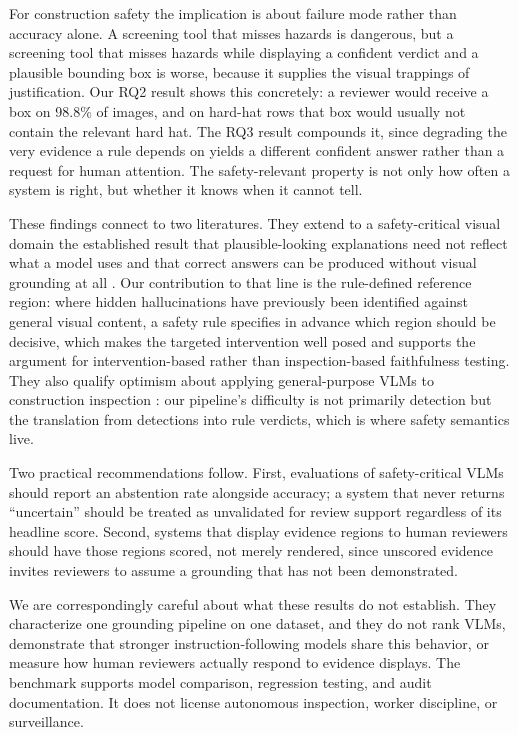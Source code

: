 \documentclass[conference]{IEEEtran}
\begin{document}
For construction safety the implication is about failure mode rather than accuracy alone. A screening tool that misses hazards is dangerous, but a screening tool that misses hazards while displaying a confident verdict and a plausible bounding box is worse, because it supplies the visual trappings of justification. Our RQ2 result shows this concretely: a reviewer would receive a box on 98.8\% of images, and on hard-hat rows that box would usually not contain the relevant hard hat. The RQ3 result compounds it, since degrading the very evidence a rule depends on yields a different confident answer rather than a request for human attention. The safety-relevant property is not only how often a system is right, but whether it knows when it cannot tell.

These findings connect to two literatures. They extend to a safety-critical visual domain the established result that plausible-looking explanations need not reflect what a model uses \cite{jain2019,wu2024} and that correct answers can be produced without visual grounding at all \cite{villa2025}. Our contribution to that line is the rule-defined reference region: where hidden hallucinations have previously been identified against general visual content, a safety rule specifies in advance which region should be decisive, which makes the targeted intervention well posed and supports the argument for intervention-based rather than inspection-based faithfulness testing. They also qualify optimism about applying general-purpose VLMs to construction inspection \cite{chen2025}: our pipeline's difficulty is not primarily detection but the translation from detections into rule verdicts, which is where safety semantics live.

Two practical recommendations follow. First, evaluations of safety-critical VLMs should report an abstention rate alongside accuracy; a system that never returns ``uncertain'' should be treated as unvalidated for review support regardless of its headline score. Second, systems that display evidence regions to human reviewers should have those regions scored, not merely rendered, since unscored evidence invites reviewers to assume a grounding that has not been demonstrated.

We are correspondingly careful about what these results do not establish. They characterize one grounding pipeline on one dataset, and they do not rank VLMs, demonstrate that stronger instruction-following models share this behavior, or measure how human reviewers actually respond to evidence displays. The benchmark supports model comparison, regression testing, and audit documentation. It does not license autonomous inspection, worker discipline, or surveillance.
\end{document}
